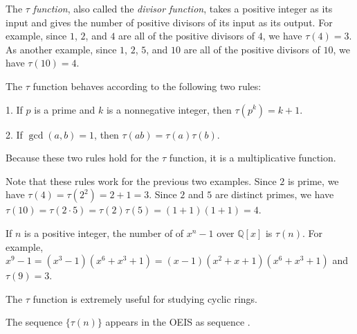 \documentclass[12pt]{article}
\begin{document}

The $\tau$ \emph{function}, also called the \emph{divisor function}, takes a positive integer as its input and gives the number of positive divisors of its input as its output.  For example, since $1$, $2$, and $4$ are all of the positive divisors of $4$, we have $\tau (4)=3$.  As another example, since $1$, $2$, $5$, and $10$ are all of the positive divisors of $10$, we have $\tau (10)=4$.

The $\tau$ function behaves according to the following two rules:

1.   If $p$ is a prime and $k$ is a nonnegative integer, then $\tau(p^k)=k+1$.

2.   If $\gcd(a,b)=1$, then $\tau(ab)=\tau(a)\tau(b)$.

Because these two rules hold for the $\tau$ function, it is a multiplicative function.

Note that these rules work for the previous two examples.  Since $2$ is prime, we have $\tau(4)=\tau(2^2)=2+1=3$.  Since $2$ and $5$ are distinct primes, we have $\tau(10)=\tau(2\cdot 5)=\tau(2)\tau(5)=(1+1)(1+1)=4$.

If $n$ is a positive integer, the number of  of $x^n-1$ over $\mathbb{Q}[x]$ is $\tau(n)$.  For example, $x^9-1=(x^3-1)(x^6+x^3+1)=(x-1)(x^2+x+1)(x^6+x^3+1)$ and $\tau(9)=3$.

The $\tau$ function is extremely useful for studying cyclic rings.

The sequence $\{\tau(n)\}$ appears in the OEIS as sequence .
\end{document}
